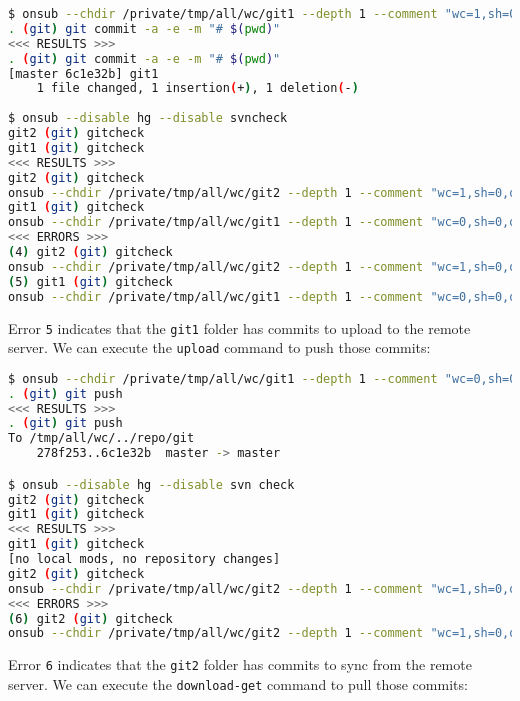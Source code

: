 \begin{snugshade}
\begin{lstlisting}[language=bash]	
$ onsub --chdir /private/tmp/all/wc/git1 --depth 1 --comment "wc=1,sh=0,out=0,in=0" {put}
. (git) git commit -a -e -m "# $(pwd)"
<<< RESULTS >>>
. (git) git commit -a -e -m "# $(pwd)"
[master 6c1e32b] git1
	1 file changed, 1 insertion(+), 1 deletion(-)
	
$ onsub --disable hg --disable svncheck
git2 (git) gitcheck
git1 (git) gitcheck
<<< RESULTS >>>
git2 (git) gitcheck
onsub --chdir /private/tmp/all/wc/git2 --depth 1 --comment "wc=1,sh=0,out=1,in=0" {put-upload}
git1 (git) gitcheck
onsub --chdir /private/tmp/all/wc/git1 --depth 1 --comment "wc=0,sh=0,out=1,in=0" {upload}
<<< ERRORS >>>
(4) git2 (git) gitcheck
onsub --chdir /private/tmp/all/wc/git2 --depth 1 --comment "wc=1,sh=0,out=1,in=0" {put-upload}
(5) git1 (git) gitcheck
onsub --chdir /private/tmp/all/wc/git1 --depth 1 --comment "wc=0,sh=0,out=1,in=0" {upload}
\end{lstlisting}
\end{snugshade}

Error \lstinline{5} indicates that the \lstinline{git1} folder has commits to upload to the remote server. We can execute the \lstinline{upload} command to push those commits:

\begin{snugshade}
\begin{lstlisting}[language=bash]	
$ onsub --chdir /private/tmp/all/wc/git1 --depth 1 --comment "wc=0,sh=0,out=1,in=0" {upload}
. (git) git push
<<< RESULTS >>>
. (git) git push
To /tmp/all/wc/../repo/git
	278f253..6c1e32b  master -> master

$ onsub --disable hg --disable svn check
git2 (git) gitcheck
git1 (git) gitcheck
<<< RESULTS >>>
git1 (git) gitcheck
[no local mods, no repository changes]
git2 (git) gitcheck
onsub --chdir /private/tmp/all/wc/git2 --depth 1 --comment "wc=1,sh=0,out=1,in=1" {download-get}
<<< ERRORS >>>
(6) git2 (git) gitcheck
onsub --chdir /private/tmp/all/wc/git2 --depth 1 --comment "wc=1,sh=0,out=1,in=1" {download-get}
\end{lstlisting}
\end{snugshade}

Error \lstinline{6} indicates that the \lstinline{git2} folder has commits to sync from the remote server. We can execute the \lstinline{download-get} command to pull those commits:

